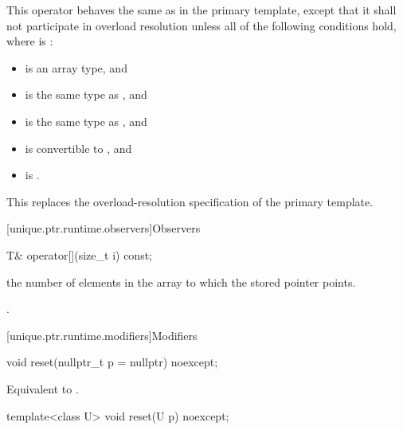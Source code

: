 \begin{itemdescr}
\pnum
This operator behaves the same as in the primary template,
except that it shall not participate in overload resolution
unless all of the following conditions hold,
where  is :
\begin{itemize}
\item {} is an array type, and
\item {} is the same type as , and
\item {} is the same type as , and
\item {} is convertible to , and
\item {} is .
\end{itemize}

\begin{note}
This replaces the overload-resolution specification of the primary template.
\end{note}
\end{itemdescr}

[unique.ptr.runtime.observers]{Observers}

%
\begin{itemdecl}
T& operator[](size_t i) const;
\end{itemdecl}

\begin{itemdescr}
\pnum
\requires {} the
number of elements in the array to which
the stored pointer points.

\pnum
\returns
{}.
\end{itemdescr}

[unique.ptr.runtime.modifiers]{Modifiers}

%
\begin{itemdecl}
void reset(nullptr_t p = nullptr) noexcept;
\end{itemdecl}

\begin{itemdescr}
\pnum
\effects
Equivalent to .
\end{itemdescr}

%
\begin{itemdecl}
template<class U> void reset(U p) noexcept;
\end{itemdecl}

